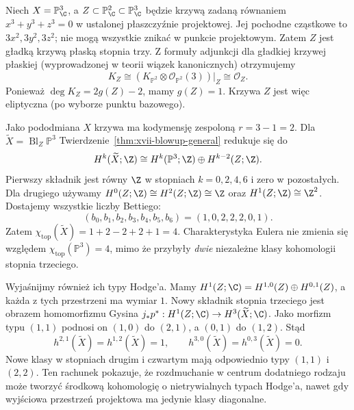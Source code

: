 \begin{przyklad}
\label{prz:xvii-blowup-elliptic-audit}
Niech $X=\mathbb P^3_\C$, a $Z\subset\mathbb P^2_\C
\subset\mathbb P^3_\C$ będzie krzywą zadaną równaniem
$x^3+y^3+z^3=0$ w ustalonej płaszczyźnie projektowej.
Jej pochodne cząstkowe to $3x^2,3y^2,3z^2$;
nie mogą wszystkie znikać w punkcie projektowym.
Zatem $Z$ jest gładką krzywą płaską stopnia trzy.
Z formuły adjunkcji dla gładkiej krzywej płaskiej
(wyprowadzonej w teorii wiązek kanonicznych) otrzymujemy
\[
 K_Z\cong
 (K_{\mathbb P^2}\otimes\mathcal O_{\mathbb P^2}(3))|_Z
 \cong\mathcal O_Z.
\]
Ponieważ $\deg K_Z=2g(Z)-2$, mamy $g(Z)=1$.
Krzywa $Z$ jest więc eliptyczna (po wyborze punktu bazowego).

Jako pododmiana $X$ krzywa ma kodymensję zespoloną
$r=3-1=2$. Dla
$\widetilde X=\operatorname{Bl}_Z\mathbb P^3$
Twierdzenie~\ref{thm:xvii-blowup-general} redukuje się do
\[
 H^k(\widetilde X;\Z)\cong
 H^k(\mathbb P^3;\Z)\oplus H^{k-2}(Z;\Z).
\]
Pierwszy składnik jest równy $\Z$ w stopniach
$k=0,2,4,6$ i zero w pozostałych.
Dla drugiego używamy
$H^0(Z;\Z)\cong H^2(Z;\Z)\cong\Z$ oraz
$H^1(Z;\Z)\cong\Z^2$. Dostajemy wszystkie liczby Bettiego:
\[
 (b_0,b_1,b_2,b_3,b_4,b_5,b_6)
   = (1,0,2,2,2,0,1).
\]
Zatem
$\chi_{\mathrm{top}}(\widetilde X)
=1+2-2+2+1=4$.
Charakterystyka Eulera nie zmienia się względem
$\chi_{\mathrm{top}}(\mathbb P^3)=4$,
mimo że przybyły \emph{dwie} niezależne
klasy kohomologii stopnia trzeciego.

Wyjaśnijmy również ich typy Hodge'a.
Mamy $H^1(Z;\C)=H^{1,0}(Z)\oplus H^{0,1}(Z)$,
a każda z tych przestrzeni ma wymiar $1$.
Nowy składnik stopnia trzeciego jest obrazem
homomorfizmu Gysina
$j_*p^*:H^1(Z;\C)\to H^3(\widetilde X;\C)$.
Jako morfizm typu $(1,1)$ podnosi on
$(1,0)$ do $(2,1)$, a $(0,1)$ do $(1,2)$.
Stąd
\[
 h^{2,1}(\widetilde X)=h^{1,2}(\widetilde X)=1,
 \qquad h^{3,0}(\widetilde X)=h^{0,3}(\widetilde X)=0.
\]
Nowe klasy w stopniach drugim i czwartym
mają odpowiednio typy $(1,1)$ i $(2,2)$.
Ten rachunek pokazuje, że rozdmuchanie w centrum
dodatniego rodzaju może tworzyć środkową
kohomologię o nietrywialnych typach Hodge'a,
nawet gdy wyjściowa przestrzeń projektowa ma
jedynie klasy diagonalne.
\end{przyklad}

